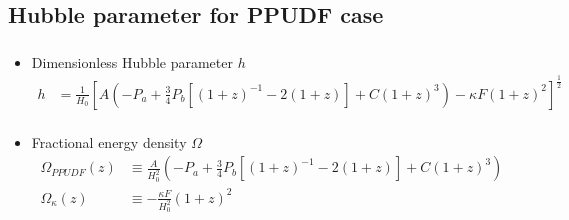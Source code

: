\documentclass[8pt,hideothersubsections]{beamer}
\newcommand{\brac}[1]{\left(#1\right)}
\newcommand{\bracc}[1]{\left[#1\right]}
\begin{document}
{\subsection{Hubble parameter for PPUDF case}
\begin{frame}
\frametitle{\insertsectionhead}
\framesubtitle{\insertsubsectionhead}
\fontsize{8pt}{7.2}\selectfont
\begin{itemize}
\item Dimensionless Hubble parameter $h$
\fontsize{6pt}{7.2}\selectfont
\begin{equation}\label{eq:UDFDimh}
\begin{split}
h &= \frac{1}{H_{0}}\bracc{A\brac{-P_{a}+\frac{3}{4}P_{b}\bracc{\brac{1+z}^{-1}-2\brac{1+z}}+C\brac{1+z}^{3}} -\kappa F \brac{1+z}^{2}}^{\frac{1}{2}}\\
\end{split}
\end{equation}
\fontsize{8pt}{7.2}\selectfont
\item Fractional energy density $\Omega$
\fontsize{6pt}{7.2}\selectfont
\begin{equation}\label{eq:UDFOmega}
\begin{split}
\Omega_{PPUDF}(z) &\equiv \frac{A}{H_{0}^{2}}\brac{-P_{a}+\frac{3}{4}P_{b}\bracc{\brac{1+z}^{-1}-2\brac{1+z}}+C\brac{1+z}^{3}}      \\
\Omega_{\kappa}(z)&\equiv -\frac{\kappa F}{H_{0}^{2}}\brac{1+z}^{2}\\
\end{split}
\end{equation}
\end{itemize}


\end{frame}}
\end{document}
